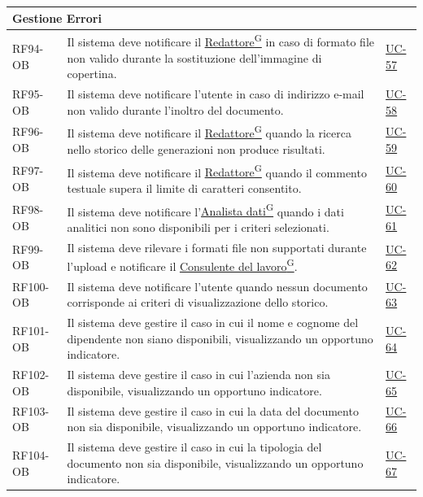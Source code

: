﻿\documentclass[a4paper,12pt]{article}
\providecommand{\glslink}[2]{\href{https://alittlebyte-19.github.io/Documentazione/glossario.html\#gls-#1}{\underline{#2}\textsuperscript{\scriptsize G}}}
\begin{document}
{\begin{longtable}{|p{2.5cm}|p{9.5cm}|p{3.5cm}|}
    \multicolumn{3}{|l|}{\cellcolor{gray!12}\textbf{Gestione Errori}} \\
    \hline
    RF94-OB & Il sistema deve notificare il \glslink{redattore}{Redattore} in caso di formato file non valido durante la sostituzione dell'immagine di copertina. & \hyperref[errore-uc-57]{UC-57} \\
    \hline
    RF95-OB & Il sistema deve notificare l'utente in caso di indirizzo e-mail non valido durante l'inoltro del documento. & \hyperref[errore-uc-58]{UC-58} \\
    \hline
    RF96-OB & Il sistema deve notificare il \glslink{redattore}{Redattore} quando la ricerca nello storico delle generazioni non produce risultati. & \hyperref[errore-uc-59]{UC-59} \\
    \hline
    RF97-OB & Il sistema deve notificare il \glslink{redattore}{Redattore} quando il commento testuale supera il limite di caratteri consentito. & \hyperref[errore-uc-60]{UC-60} \\
    \hline
    RF98-OB & Il sistema deve notificare l'\glslink{analista-dati}{Analista dati} quando i dati analitici non sono disponibili per i criteri selezionati. & \hyperref[errore-uc-61]{UC-61} \\
    \hline
    RF99-OB & Il sistema deve rilevare i formati file non supportati durante l'upload e notificare il \glslink{consulente-del-lavoro-cdl}{Consulente del lavoro}. & \hyperref[errore-uc-62]{UC-62} \\
    \hline
    RF100-OB & Il sistema deve notificare l'utente quando nessun documento corrisponde ai criteri di visualizzazione dello storico. & \hyperref[errore-uc-63]{UC-63} \\
    \hline
    RF101-OB & Il sistema deve gestire il caso in cui il nome e cognome del dipendente non siano disponibili, visualizzando un opportuno indicatore. & \hyperref[errore-uc-64]{UC-64} \\
    \hline
    RF102-OB & Il sistema deve gestire il caso in cui l'azienda non sia disponibile, visualizzando un opportuno indicatore. & \hyperref[errore-uc-65]{UC-65} \\
    \hline
    RF103-OB & Il sistema deve gestire il caso in cui la data del documento non sia disponibile, visualizzando un opportuno indicatore. & \hyperref[errore-uc-66]{UC-66} \\
    \hline
    RF104-OB & Il sistema deve gestire il caso in cui la tipologia del documento non sia disponibile, visualizzando un opportuno indicatore. & \hyperref[errore-uc-67]{UC-67} \\

\end{longtable}}
\end{document}
